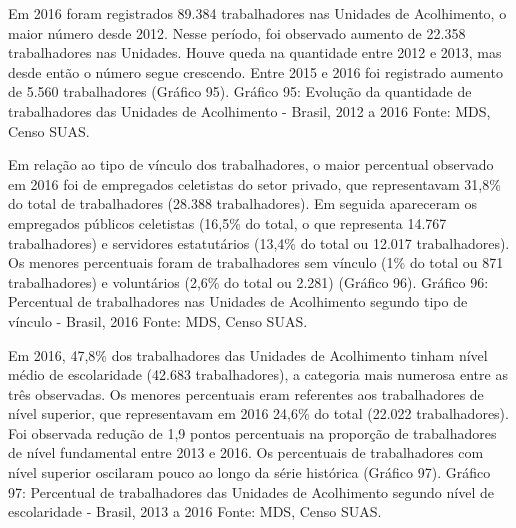 \documentclass[
  brazilian]{report}
\begin{document}
Em 2016 foram registrados 89.384 trabalhadores nas Unidades de
Acolhimento, o maior número desde 2012. Nesse período, foi observado
aumento de 22.358 trabalhadores nas Unidades. Houve queda na quantidade
entre 2012 e 2013, mas desde então o número segue crescendo. Entre 2015
e 2016 foi registrado aumento de 5.560 trabalhadores (Gráfico 95).
Gráfico 95: Evolução da quantidade de trabalhadores das Unidades de
Acolhimento - Brasil, 2012 a 2016 Fonte: MDS, Censo SUAS.

Em relação ao tipo de vínculo dos trabalhadores, o maior percentual
observado em 2016 foi de empregados celetistas do setor privado, que
representavam 31,8\% do total de trabalhadores (28.388 trabalhadores).
Em seguida apareceram os empregados públicos celetistas (16,5\% do
total, o que representa 14.767 trabalhadores) e servidores estatutários
(13,4\% do total ou 12.017 trabalhadores). Os menores percentuais foram
de trabalhadores sem vínculo (1\% do total ou 871 trabalhadores) e
voluntários (2,6\% do total ou 2.281) (Gráfico 96). Gráfico 96:
Percentual de trabalhadores nas Unidades de Acolhimento segundo tipo de
vínculo - Brasil, 2016 Fonte: MDS, Censo SUAS.

Em 2016, 47,8\% dos trabalhadores das Unidades de Acolhimento tinham
nível médio de escolaridade (42.683 trabalhadores), a categoria mais
numerosa entre as três observadas. Os menores percentuais eram
referentes aos trabalhadores de nível superior, que representavam em
2016 24,6\% do total (22.022 trabalhadores). Foi observada redução de
1,9 pontos percentuais na proporção de trabalhadores de nível
fundamental entre 2013 e 2016. Os percentuais de trabalhadores com nível
superior oscilaram pouco ao longo da série histórica (Gráfico 97).
Gráfico 97: Percentual de trabalhadores das Unidades de Acolhimento
segundo nível de escolaridade - Brasil, 2013 a 2016 Fonte: MDS, Censo
SUAS.
\end{document}
